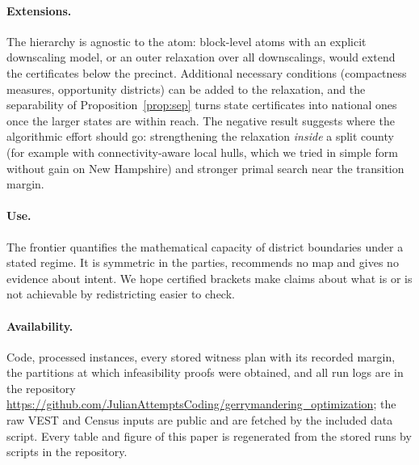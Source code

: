\paragraph{Extensions.}
The hierarchy is agnostic to the atom: block-level atoms with an explicit downscaling model, or an outer relaxation over all downscalings, would extend the certificates below the precinct. Additional necessary conditions (compactness measures, opportunity districts) can be added to the relaxation, and the separability of Proposition~\ref{prop:sep} turns state certificates into national ones once the larger states are within reach. The negative result suggests where the algorithmic effort should go: strengthening the relaxation \emph{inside} a split county (for example with connectivity-aware local hulls, which we tried in simple form without gain on New Hampshire) and stronger primal search near the transition margin.

\paragraph{Use.}
The frontier quantifies the mathematical capacity of district boundaries under a stated regime. It is symmetric in the parties, recommends no map and gives no evidence about intent. We hope certified brackets make claims about what is or is not achievable by redistricting easier to check.

\paragraph{Availability.}
Code, processed instances, every stored witness plan with its recorded margin, the partitions at which infeasibility proofs were obtained, and all run logs are in the repository \url{https://github.com/JulianAttemptsCoding/gerrymandering_optimization}; the raw VEST and Census inputs are public and are fetched by the included data script. Every table and figure of this paper is regenerated from the stored runs by scripts in the repository.
